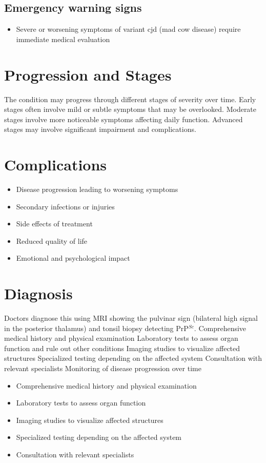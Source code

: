 \subsection{Emergency warning signs}
\begin{itemize}[noitemsep]
  \item Severe or worsening symptoms of variant cjd (mad cow disease) require immediate medical evaluation
\end{itemize}
\section{Progression and Stages}
The condition may progress through different stages of severity over time. Early stages often involve mild or subtle symptoms that may be overlooked. Moderate stages involve more noticeable symptoms affecting daily function. Advanced stages may involve significant impairment and complications.
\section{Complications}
\begin{itemize}[noitemsep]
  \item Disease progression leading to worsening symptoms
  \item Secondary infections or injuries
  \item Side effects of treatment
  \item Reduced quality of life
  \item Emotional and psychological impact
\end{itemize}
\section{Diagnosis}
Doctors diagnose this using MRI showing the pulvinar sign (bilateral high signal in the posterior thalamus) and tonsil biopsy detecting PrP$^{Sc}$. Comprehensive medical history and physical examination Laboratory tests to assess organ function and rule out other conditions Imaging studies to visualize affected structures Specialized testing depending on the affected system Consultation with relevant specialists Monitoring of disease progression over time

\begin{itemize}[noitemsep]
  \item Comprehensive medical history and physical examination
  \item Laboratory tests to assess organ function
  \item Imaging studies to visualize affected structures
  \item Specialized testing depending on the affected system
  \item Consultation with relevant specialists
\end{itemize}
